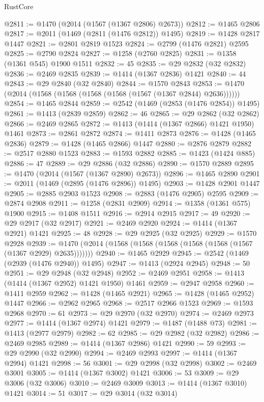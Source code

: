 \begin{lexlean}{RustCore}
\begin{coremodule}
@2811 := @1470 (@2014 (@1567 (@1367 @2806) @2673))
@2812 := @1465 @2806
@2817 := @2011 (@1469 (@2811 (@1476 @2812)) @1495)
@2819 := @1428 @2817 @1447
@2821 := @2801 @2819 @1523
@2824 := @2799 (@1476 @2821) @2595
@2825 := @2790 @2824
@2827 := @1258 (@2760 @2825)
@2831 := @1358 (@1361 @545) @1900 @1511
@2832 := 45
@2835 := @29 @2832 (@32 @2832)
@2836 := @2469 @2835
@2839 := @1414 (@1367 @2836) @1421
@2840 := 44
@2843 := @29 @2840 (@32 @2840)
@2844 := @1570 @2843
@2853 := @1470 (@2014 (@1568 (@1568 (@1568 (@1568 (@1567 (@1367 @2844) @2636))))))
@2854 := @1465 @2844
@2859 := @2542 (@1469 (@2853 (@1476 @2854)) @1495)
@2861 := @1413 (@2839 @2859)
@2862 := 46
@2865 := @29 @2862 (@32 @2862)
@2866 := @2469 @2865
@2872 := @1413 (@1414 (@1367 @2866) @1421 @1950) @1461
@2873 := @2861 @2872
@2874 := @1411 @2873
@2876 := @1428 (@1465 @2836)
@2879 := @1428 (@1465 @2866) @1447
@2880 := @2876 @2879
@2882 := @2517 @2880 @1523
@2883 := @1593 @2882
@2885 := @1423 (@1424 @885)
@2886 := 47
@2889 := @29 @2886 (@32 @2886)
@2890 := @1570 @2889
@2895 := @1470 (@2014 (@1567 (@1367 @2890) @2673))
@2896 := @1465 @2890
@2901 := @2011 (@1469 (@2895 (@1476 @2896)) @1495)
@2903 := @1428 @2901 @1447
@2905 := @2885 @2903 @1523
@2908 := @2883 (@1476 @2905) @2595
@2909 := @2874 @2908
@2911 := @1258 (@2831 @2909)
@2914 := @1358 (@1361 @575) @1900
@2915 := @1408 @1511
@2916 := @2914 @2915
@2917 := 49
@2920 := @29 @2917 (@32 @2917)
@2921 := @2469 @2920
@2924 := @1414 (@1367 @2921) @1421
@2925 := 48
@2928 := @29 @2925 (@32 @2925)
@2929 := @1570 @2928
@2939 := @1470 (@2014 (@1568 (@1568 (@1568 (@1568 (@1568 (@1567 (@1367 @2929) @2635)))))))
@2940 := @1465 @2929
@2945 := @2542 (@1469 (@2939 (@1476 @2940)) @1495)
@2947 := @1413 (@2924 @2945)
@2948 := 50
@2951 := @29 @2948 (@32 @2948)
@2952 := @2469 @2951
@2958 := @1413 (@1414 (@1367 @2952) @1421 @1950) @1461
@2959 := @2947 @2958
@2960 := @1411 @2959
@2962 := @1428 (@1465 @2921)
@2965 := @1428 (@1465 @2952) @1447
@2966 := @2962 @2965
@2968 := @2517 @2966 @1523
@2969 := @1593 @2968
@2970 := 61
@2973 := @29 @2970 (@32 @2970)
@2974 := @2469 @2973
@2977 := @1414 (@1367 @2974) @1421
@2979 := @1487 (@1488 @73)
@2981 := @1413 (@2977 @2979)
@2982 := 62
@2985 := @29 @2982 (@32 @2982)
@2986 := @2469 @2985
@2989 := @1414 (@1367 @2986) @1421
@2990 := 59
@2993 := @29 @2990 (@32 @2990)
@2994 := @2469 @2993
@2997 := @1414 (@1367 @2994) @1421
@2998 := 56
@3001 := @29 @2998 (@32 @2998)
@3002 := @2469 @3001
@3005 := @1414 (@1367 @3002) @1421
@3006 := 53
@3009 := @29 @3006 (@32 @3006)
@3010 := @2469 @3009
@3013 := @1414 (@1367 @3010) @1421
@3014 := 51
@3017 := @29 @3014 (@32 @3014)

\end{coremodule}
\end{lexlean}
